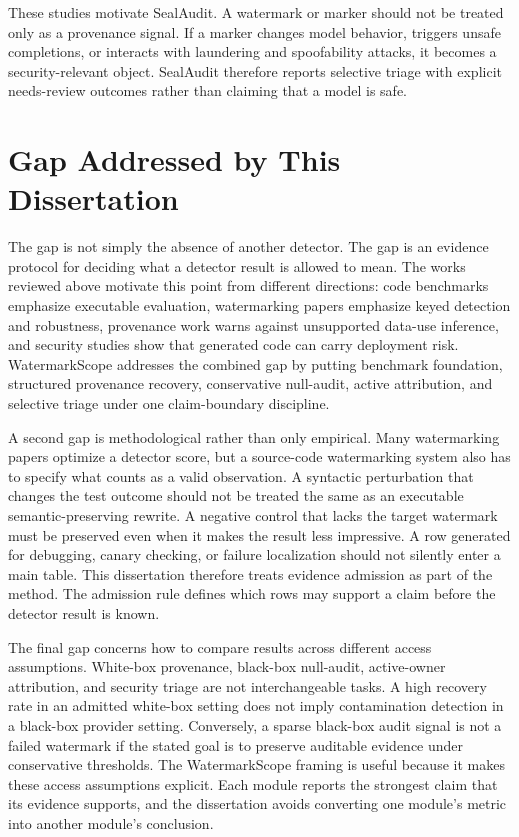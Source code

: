 These studies motivate SealAudit. A watermark or marker should not be treated only as a provenance signal. If a marker changes model behavior, triggers unsafe completions, or interacts with laundering and spoofability attacks, it becomes a security-relevant object. SealAudit therefore reports selective triage with explicit needs-review outcomes rather than claiming that a model is safe.

\section{Gap Addressed by This Dissertation}

The gap is not simply the absence of another detector. The gap is an evidence protocol for deciding what a detector result is allowed to mean. The works reviewed above motivate this point from different directions: code benchmarks emphasize executable evaluation, watermarking papers emphasize keyed detection and robustness, provenance work warns against unsupported data-use inference, and security studies show that generated code can carry deployment risk. WatermarkScope addresses the combined gap by putting benchmark foundation, structured provenance recovery, conservative null-audit, active attribution, and selective triage under one claim-boundary discipline.

A second gap is methodological rather than only empirical. Many watermarking papers optimize a detector score, but a source-code watermarking system also has to specify what counts as a valid observation. A syntactic perturbation that changes the test outcome should not be treated the same as an executable semantic-preserving rewrite. A negative control that lacks the target watermark must be preserved even when it makes the result less impressive. A row generated for debugging, canary checking, or failure localization should not silently enter a main table. This dissertation therefore treats evidence admission as part of the method. The admission rule defines which rows may support a claim before the detector result is known.

The final gap concerns how to compare results across different access assumptions. White-box provenance, black-box null-audit, active-owner attribution, and security triage are not interchangeable tasks. A high recovery rate in an admitted white-box setting does not imply contamination detection in a black-box provider setting. Conversely, a sparse black-box audit signal is not a failed watermark if the stated goal is to preserve auditable evidence under conservative thresholds. The WatermarkScope framing is useful because it makes these access assumptions explicit. Each module reports the strongest claim that its evidence supports, and the dissertation avoids converting one module's metric into another module's conclusion.

